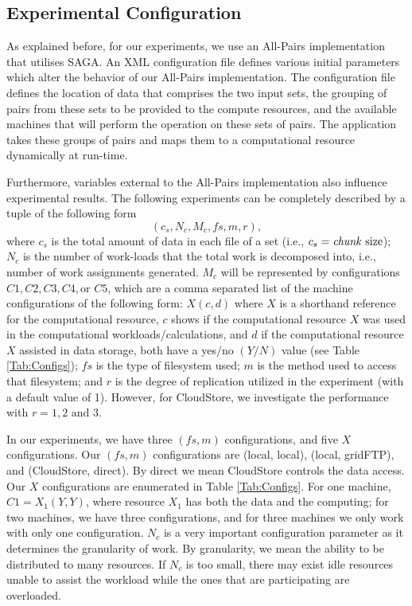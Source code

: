 \documentclass{rspublic}
\begin{document}
\vspace{-0.3cm}

\subsection{Experimental Configuration}

As explained before, for our experiments, we use an All-Pairs
implementation that utilises SAGA. An XML configuration file defines
various initial parameters which alter the behavior of our All-Pairs
implementation. The configuration file defines the location of data that
comprises the two input sets, the grouping of pairs from these sets to
be provided to the compute resources, and the available machines that
will perform the operation on these sets of pairs. The application takes
these groups of pairs and maps them to a computational resource
dynamically at run-time.

Furthermore, variables external to the All-Pairs implementation also
influence experimental results. The following experiments can be
completely described by a tuple of the following form
 \begin{equation}
(c_s, N_c, M_c, f\!s, m,r),
\label{Eq:tuple}
\end{equation}
where $c_s$ is the total amount of data in each file of a set (i.e.,
$c_s=\mbox{\textit{chunk} size}$); $N_c$ is the number of work-loads
that the total work is decomposed into, i.e., number of work assignments
generated. $M_c$ will be
represented by configurations $C1, C2, C3, C4, \mbox{or } C5$, which are
a comma separated list of the machine configurations of the following
form: $X(c, d)$ where $X$ is a shorthand reference for the computational
resource, $c$ shows if the computational resource $X$ was used in the
computational workloads/calculations, and $d$ if the computational
resource $X$ assisted in data storage, both have a yes/no $(Y/N)$ value
(see Table \ref{Tab:Configs}); $f\!s$ is the type of filesystem used;
$m$ is the method used to access that filesystem; and $r$ is the degree
of replication utilized in the experiment (with a default value of 1).
However, for CloudStore, we investigate the performance with $r = 1, 2
\mbox{ and } 3$.

In our experiments, we have three $(f\!s, m)$ configurations, and five
$X$ configurations. Our $(f\!s, m)$ configurations are (local, local),
(local, gridFTP), and (CloudStore, direct). By direct we mean CloudStore
controls the data access. Our $X$ configurations are enumerated in Table
\ref{Tab:Configs}. For one machine, $C1=X_1(Y,Y)$, where resource $X_1$
has both the data and the computing; for two machines, we have three
configurations, and for three machines we only work with only one
configuration. $N_c$ is a very important configuration parameter as it
determines the granularity of work. By granularity, we mean the ability
to be distributed to many resources.  If $N_c$ is too small, there may
exist idle resources unable to assist the workload while the ones that
are participating are overloaded.
\end{document}
